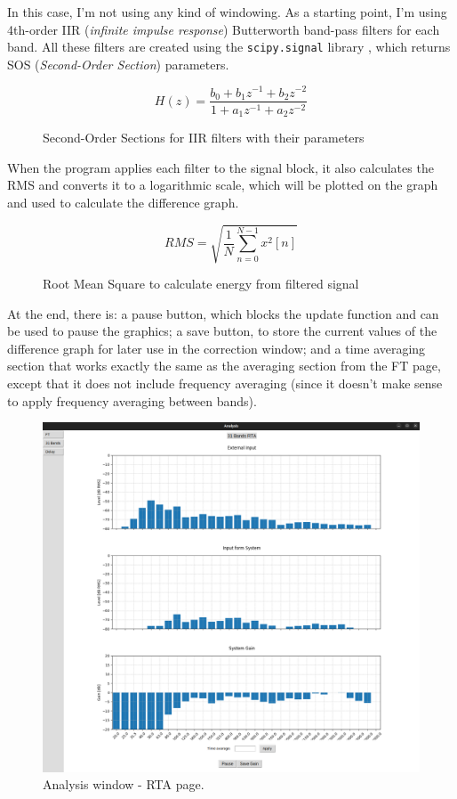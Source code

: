 In this case, I'm not using any kind of windowing. As a starting point, I'm using 4th-order IIR (\textit{infinite impulse response}) Butterworth band-pass filters for each band. All these filters are created using the \texttt{scipy.signal} library \cite{scipy_signal}, which returns SOS (\textit{Second-Order Section}) parameters.

\begin{figure}[H]
	\centering
	\caption{Second-Order Sections for IIR filters with their parameters}
	\[
	H(z) = \frac{b_0 + b_1 z^{-1} + b_2 z^{-2}}{1 + a_1 z^{-1} + a_2 z^{-2}}
	\]
\end{figure}

When the program applies each filter to the signal block, it also calculates the RMS and converts it to a logarithmic scale, which will be plotted on the graph and used to calculate the difference graph.

\begin{figure}[H]
	\centering
	\caption{Root Mean Square to calculate energy from filtered signal}
	\[
	RMS = \sqrt{ \frac{1}{N} \sum_{n=0}^{N-1} x^2[n] }
	\]
\end{figure}

At the end, there is: a pause button, which blocks the update function and can be used to pause the graphics; a save button, to store the current values of the difference graph for later use in the correction window; and a time averaging section that works exactly the same as the averaging section from the FT page, except that it does not include frequency averaging (since it doesn't make sense to apply frequency averaging between bands).

\begin{figure}[H]
	\centering
	\includegraphics[width=1
	\linewidth]{Figures/RTA_page.png}
	\caption{Analysis window - RTA page.}
	\label{fig:RTA_page}
\end{figure}


